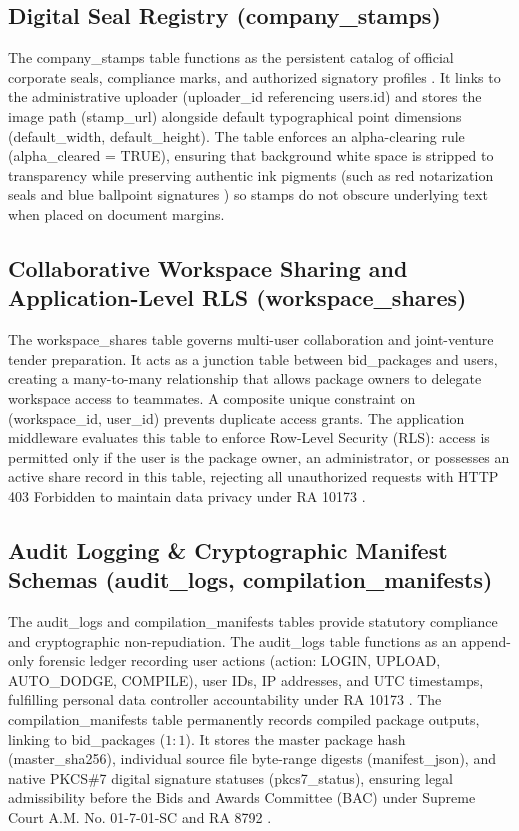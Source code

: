 \subsection{Digital Seal Registry (company\_stamps)}
The company\_stamps table functions as the persistent catalog of official corporate seals, compliance marks, and authorized signatory profiles \cite{ref46}.
It links to the administrative uploader (uploader\_id referencing users.id) and stores the image path (stamp\_url) alongside default typographical point dimensions (default\_width, default\_height).
The table enforces an alpha-clearing rule (alpha\_cleared = TRUE), ensuring that background white space is stripped to transparency while preserving authentic ink pigments (such as red notarization seals and blue ballpoint signatures \cite{ref49}) so stamps do not obscure underlying text when placed on document margins.

\subsection{Collaborative Workspace Sharing and Application-Level RLS (workspace\_shares)}
The workspace\_shares table governs multi-user collaboration and joint-venture tender preparation.
It acts as a junction table between bid\_packages and users, creating a many-to-many relationship that allows package owners to delegate workspace access to teammates.
A composite unique constraint on (workspace\_id, user\_id) prevents duplicate access grants.
The application middleware evaluates this table to enforce Row-Level Security (RLS): access is permitted only if the user is the package owner, an administrator, or possesses an active share record in this table, rejecting all unauthorized requests with HTTP 403 Forbidden to maintain data privacy under RA 10173 \cite{ref6}.

\subsection{Audit Logging \& Cryptographic Manifest Schemas (audit\_logs, compilation\_manifests)}
The audit\_logs and compilation\_manifests tables provide statutory compliance and cryptographic non-repudiation.
The audit\_logs table functions as an append-only forensic ledger recording user actions (action: LOGIN, UPLOAD, AUTO\_DODGE, COMPILE), user IDs, IP addresses, and UTC timestamps, fulfilling personal data controller accountability under RA 10173 \cite{ref6}.
The compilation\_manifests table permanently records compiled package outputs, linking to bid\_packages ($1:1$).
It stores the master package hash (master\_sha256), individual source file byte-range digests (manifest\_json), and native PKCS\#7 digital signature statuses (pkcs7\_status), ensuring legal admissibility before the Bids and Awards Committee (BAC) under Supreme Court A.M. No. 01-7-01-SC \cite{ref11} and RA 8792 \cite{ref10}.

